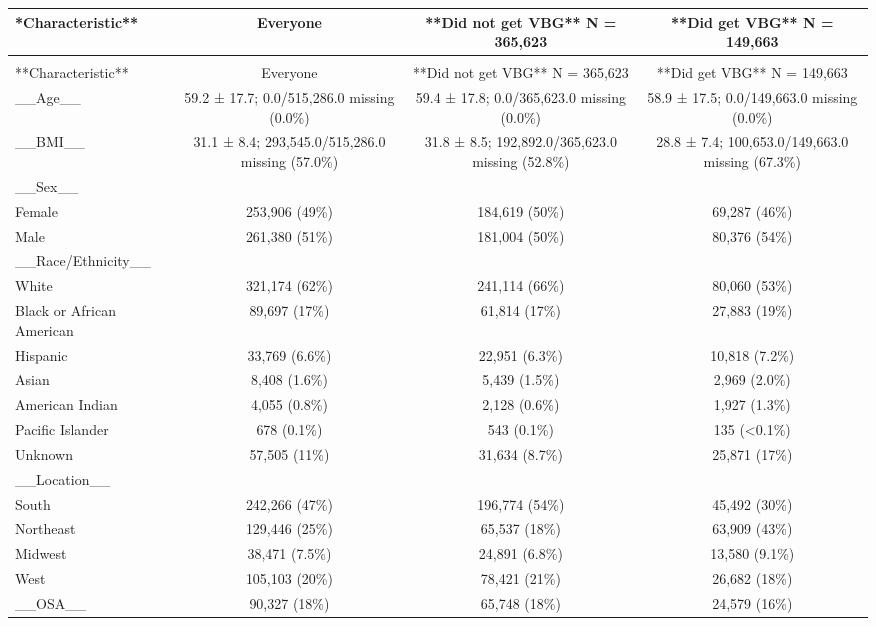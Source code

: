 \documentclass[
  11pt,
  letterpaper,
  DIV=11,
  numbers=noendperiod]{scrartcl}
\begin{document}
\begin{longtable*}{>{\raggedright\arraybackslash}p{2.0in}ccc}
\toprule
**Characteristic** & Everyone & **Did not get VBG**  N = 365,623 & **Did get VBG**  N = 149,663\\
\midrule
\endfirsthead
{}\\
\toprule
**Characteristic** & Everyone & **Did not get VBG**  N = 365,623 & **Did get VBG**  N = 149,663\\
\midrule
\endhead

\endfoot
\bottomrule
\endlastfoot
\_\_Age\_\_ & 59.2 ± 17.7; 0.0/515,286.0 missing (0.0\%) & 59.4 ± 17.8; 0.0/365,623.0 missing (0.0\%) & 58.9 ± 17.5; 0.0/149,663.0 missing (0.0\%)\\
\_\_BMI\_\_ & 31.1 ± 8.4; 293,545.0/515,286.0 missing (57.0\%) & 31.8 ± 8.5; 192,892.0/365,623.0 missing (52.8\%) & 28.8 ± 7.4; 100,653.0/149,663.0 missing (67.3\%)\\
\_\_Sex\_\_ &  &  & \\
Female & 253,906 (49\%) & 184,619 (50\%) & 69,287 (46\%)\\
Male & 261,380 (51\%) & 181,004 (50\%) & 80,376 (54\%)\\
\addlinespace
\_\_Race/Ethnicity\_\_ &  &  & \\
White & 321,174 (62\%) & 241,114 (66\%) & 80,060 (53\%)\\
Black or African American & 89,697 (17\%) & 61,814 (17\%) & 27,883 (19\%)\\
Hispanic & 33,769 (6.6\%) & 22,951 (6.3\%) & 10,818 (7.2\%)\\
Asian & 8,408 (1.6\%) & 5,439 (1.5\%) & 2,969 (2.0\%)\\
\addlinespace
American Indian & 4,055 (0.8\%) & 2,128 (0.6\%) & 1,927 (1.3\%)\\
Pacific Islander & 678 (0.1\%) & 543 (0.1\%) & 135 (<0.1\%)\\
Unknown & 57,505 (11\%) & 31,634 (8.7\%) & 25,871 (17\%)\\
\_\_Location\_\_ &  &  & \\
South & 242,266 (47\%) & 196,774 (54\%) & 45,492 (30\%)\\
\addlinespace
Northeast & 129,446 (25\%) & 65,537 (18\%) & 63,909 (43\%)\\
Midwest & 38,471 (7.5\%) & 24,891 (6.8\%) & 13,580 (9.1\%)\\
West & 105,103 (20\%) & 78,421 (21\%) & 26,682 (18\%)\\
\_\_OSA\_\_ & 90,327 (18\%) & 65,748 (18\%) & 24,579 (16\%)\\

\end{longtable*}
\end{document}
